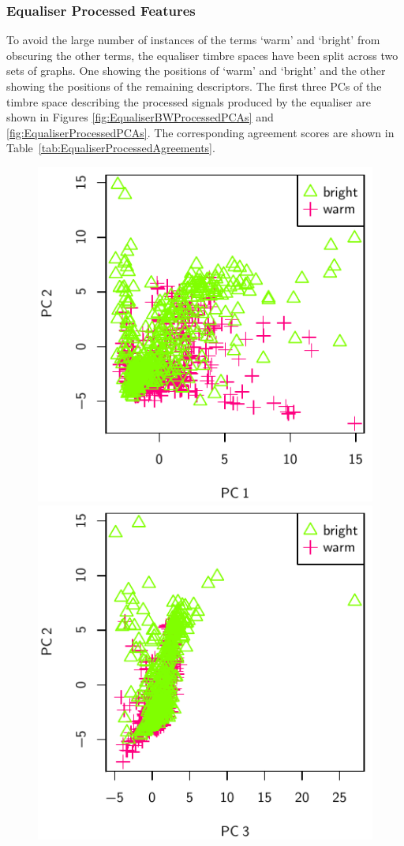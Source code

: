 		\subsubsection*{Equaliser Processed Features}
			To avoid the large number of instances of the terms `warm' and `bright' from obscuring the other
			terms, the equaliser timbre spaces have been split across two sets of graphs. One showing the
			positions of `warm' and `bright' and the other showing the positions of the remaining descriptors.
			The first three PCs of the timbre space describing the processed signals produced by the equaliser
			are shown in Figures \ref{fig:EqualiserBWProcessedPCAs} and \ref{fig:EqualiserProcessedPCAs}. The
			corresponding agreement scores are shown in Table~\ref{tab:EqualiserProcessedAgreements}.

			\begin{figure}[h!]
				\centering
				\subfloat
				{
					\includegraphics{chapter4/Images/EqualiserBWProcessedPCA1-2.pdf}
					\label{fig:EqualiserProcessedPCA1-2}
				}
				\quad
				\subfloat
				{
					\includegraphics{chapter4/Images/EqualiserBWProcessedPCA3-2.pdf}
}
\end{figure}

